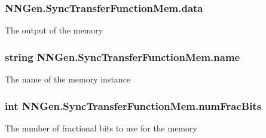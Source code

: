 \subsubsection[{data}]{ N\+N\+Gen.\+Sync\+Transfer\+Function\+Mem.\+data\hspace{0.3cm}{\ttfamily [get]}}\label{class_n_n_gen_1_1_sync_transfer_function_mem_a1afdcfbaa9233adc7673c2a59724accb}


The output of the memory 

\hypertarget{class_n_n_gen_1_1_sync_transfer_function_mem_adb5f86e770954ca55c554848ea65a5f8}{}
\subsubsection[{name}]{\setlength{\rightskip}{0pt plus 5cm}string N\+N\+Gen.\+Sync\+Transfer\+Function\+Mem.\+name\hspace{0.3cm}{\ttfamily [get]}}\label{class_n_n_gen_1_1_sync_transfer_function_mem_adb5f86e770954ca55c554848ea65a5f8}


The name of the memory instance 

\hypertarget{class_n_n_gen_1_1_sync_transfer_function_mem_ae036daf729a3381857761582bb573498}{}
\subsubsection[{num\+Frac\+Bits}]{\setlength{\rightskip}{0pt plus 5cm}int N\+N\+Gen.\+Sync\+Transfer\+Function\+Mem.\+num\+Frac\+Bits\hspace{0.3cm}{\ttfamily [get]}}\label{class_n_n_gen_1_1_sync_transfer_function_mem_ae036daf729a3381857761582bb573498}


The number of fractional bits to use for the memory 

\hypertarget{class_n_n_gen_1_1_sync_transfer_function_mem_ac004657938e8276bfcaf430399237501}{}
